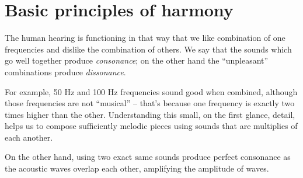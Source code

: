 \newpage
\section{Basic principles of harmony}

The human hearing is functioning in that way that we like combination of one
frequencies and dislike the combination of others.  We say that the sounds which
go well together produce \emph{consonance}; on the other hand the ``unpleasant''
combinations produce \emph{dissonance}.

For example, 50 Hz and 100 Hz frequencies sound good when combined, although
those frequencies are not ``musical'' -- that's because one frequency is exactly
two times higher than the other.  Understanding this small, on the first glance,
detail, helps us to compose sufficiently melodic pieces using sounds that are
multiplies of each another.

On the other hand, using two exact same sounds produce perfect consonance as the
acoustic waves overlap each other, amplifying the amplitude of waves.




